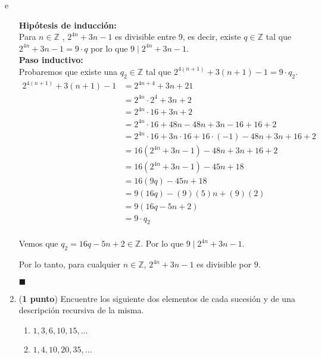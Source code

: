 e\documentclass[fontsize=12pt]{scrartcl}
\begin{document}
\begin{enumerate}
                   \textbf{Hipótesis de inducción:} \\
                   Para $n \in \mathbb{Z}$ , $2^{4n} + 3n - 1$ es divisible entre 9, es decir, existe $q \in \mathbb{Z} $ tal que $2^{4n} + 3n - 1 = 9 \cdot q$ por lo que $9 \mid 2^{4n} + 3n - 1 $. \\
                   \textbf{Paso inductivo:} \\
                   Probaremos que existe una $q_2 \in \mathbb{Z}$ tal que $2^{4(n+1)} + 3(n+1) - 1 = 9 \cdot q_2$.
                   \begin{equation*}
                  \begin{split}
                    2^{4(n+1)} + 3(n+1) - 1 &= 2^{4n+4} + 3n+21 \\
                    &=  2^{4n} \cdot 2^{4} + 3n+ 2 \\
                    &=  2^{4n} \cdot 16 + 3n+ 2  \\
                    &= 2^{4n} \cdot 16 +48 n -48n +3n -16 + 16 +2  \\
                    &= 2^{4n} \cdot 16 +3n \cdot 16 +16\cdot (-1 )-48n +3n + 16 +2  \\
                    &= 16 ( 2^{4n}  + 3n-1) -48n +3n + 16 +2  \\
                    &= 16 (2^{4n}  + 3n-1) -45n+18 \\
                    &= 16 (9q) -45n+18 \\
                    &= 9 (16q) - (9)(5)n+(9)(2)   \\
                    &=  9 (16q - 5n +2)  \\
                    &=  9 \cdot q_2  \\
                  \end{split}
                   \end{equation*}

                   Vemos que $q_2 = 16q - 5n +2 \in \mathbb{Z}$. Por lo que  $9 \mid 2^{4n} + 3n - 1 $.

Por lo tanto, para cualquier $n \in \mathbb{Z}$, $2^{4n} + 3n - 1$ es divisible por $9$.
\begin{flushright}
  $\blacksquare$
\end{flushright}

		\item ({\bf 1 punto}) Encuentre los siguiente dos elementos de cada 
		sucesi\'on y de una descripci\'on recursiva de la misma.
			\begin{enumerate}
				\item $1, 3, 6, 10, 15, \dots$
				\item $1, 4, 10, 20, 35, \dots$
			\end{enumerate}
		

\end{enumerate}
\end{document}
